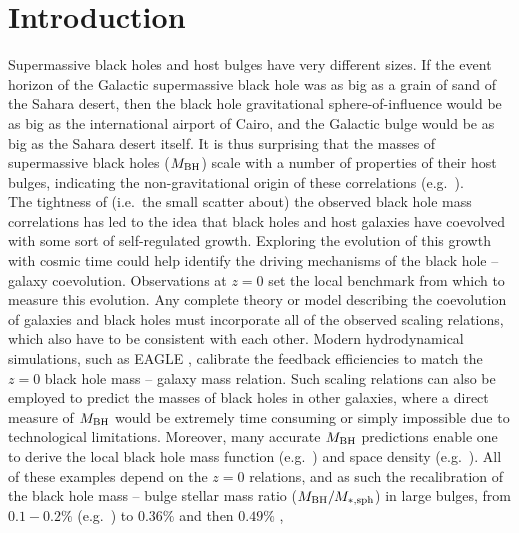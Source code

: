 \documentclass[preprint2]{emulateapj}
\begin{document}
\section{Introduction}
\label{sec:int}
Supermassive black holes and host bulges have very different sizes. 
If the event horizon of the Galactic supermassive black hole was as big as a grain of sand of the Sahara desert, 
then the black hole gravitational sphere-of-influence would be as big as the international airport of Cairo, 
and the Galactic bulge would be as big as the Sahara desert itself.
It is thus surprising that the masses of supermassive black holes ($M_{\rm BH}$) 
scale with a number of properties of their host bulges, 
indicating the non-gravitational origin of these correlations 
(e.g.~\citealt{dressler1989,yee1992,kormendyrichstone1995,laor1997,magorrian1998,ferraresemerritt2000,gebhardt2000,graham2001,
marconihunt2003,haringrix2004,graham2012bent,grahamscott2015}). \\
The tightness of (i.e.~the small scatter about) the observed black hole mass correlations has led to the idea
that black holes and host galaxies have coevolved with some sort of self-regulated growth.
Exploring the evolution of this growth with cosmic time could help identify
the driving mechanisms of the black hole -- galaxy coevolution.
Observations at $z=0$ set the local benchmark from which to measure this evolution.
Any complete theory or model describing the coevolution of galaxies and black holes must incorporate 
all of the observed scaling relations, which also have to be consistent with each other.
Modern hydrodynamical simulations, such as EAGLE \citep{schaye2015}, calibrate the feedback efficiencies 
to match the $z=0$ black hole mass -- galaxy mass relation.
Such scaling relations can also be employed to predict the masses of black holes in other galaxies, where a direct
measure of $M_{\rm BH}$ would be extremely time consuming or simply impossible due to technological limitations.
Moreover, many accurate $M_{\rm BH}$ predictions enable one to derive 
the local black hole mass function (e.g.~\citealt{salucci1999,graham2007smbhmassfunction}) 
and space density (e.g.~\citealt{grahamdriver2007smbhmassdensity,comastri2015}). 
All of these examples depend on the $z=0$ relations, 
and as such the recalibration of the black hole mass -- bulge stellar mass ratio ($M_{\rm BH}/M_{\rm *,sph}$) in large bulges,
from $0.1 - 0.2\%$ (e.g.~\citealt{haringrix2004}) to $0.36\%$ \citep{graham2012bent} and then $0.49\%$ \citep{grahamscott2015}, 
\end{document}
